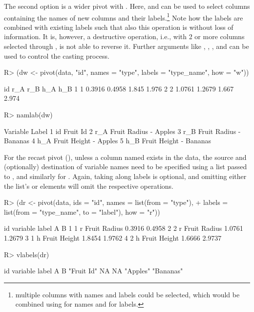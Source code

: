 \documentclass[article]{jss}
\newcommand{\fct}[1]{\code{#1()}}
\begin{document}
The second option is a wider pivot with . Here,  and  can be used to select columns containing the names of new columns and their labels.\footnote{multiple columns with names and labels could be selected, which would be combined using  for names and  for labels.} Note how the labels are combined with existing labels such that also this operation is without loss of information. It is, however, a destructive operation, i.e., with 2 or more columns selected through , \fct{pivot} is not able to reverse it. Further arguments like , , , and  can be used to control the casting process.
%
\begin{Schunk}
\begin{Sinput}
R> (dw <- pivot(data, "id", names = "type", labels = "type_name", how = "w"))
\end{Sinput}
\begin{Soutput}
  id    r_A    r_B   h_A   h_B
1  1 0.3916 0.4958 1.845 1.976
2  2 1.0761 1.2679 1.667 2.974
\end{Soutput}
\begin{Sinput}
R> namlab(dw)
\end{Sinput}
\begin{Soutput}
  Variable                  Label
1       id               Fruit Id
2      r_A  Fruit Radius - Apples
3      r_B Fruit Radius - Bananas
4      h_A  Fruit Height - Apples
5      h_B Fruit Height - Bananas
\end{Soutput}
\end{Schunk}
%
For the recast pivot (), unless a column named  exists in the data, the source and (optionally) destination of variable names need to be specified using a list passed to , and similarly for . Again, taking along labels is optional, and omitting either the list's  or  elements will omit the respective operations.
%
\begin{Schunk}
\begin{Sinput}
R> (dr <- pivot(data, ids = "id", names = list(from = "type"),
+               labels = list(from = "type_name", to = "label"), how = "r"))
\end{Sinput}
\begin{Soutput}
  id variable        label      A      B
1  1        r Fruit Radius 0.3916 0.4958
2  2        r Fruit Radius 1.0761 1.2679
3  1        h Fruit Height 1.8454 1.9762
4  2        h Fruit Height 1.6666 2.9737
\end{Soutput}
\begin{Sinput}
R> vlabels(dr)
\end{Sinput}
\begin{Soutput}
        id   variable      label          A          B 
"Fruit Id"         NA         NA   "Apples"  "Bananas" 
\end{Soutput}
\end{Schunk}
\end{document}
